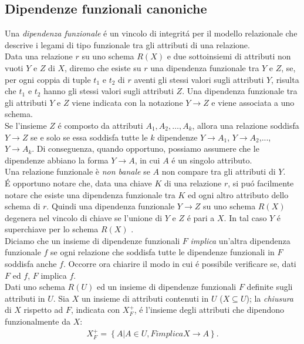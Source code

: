 \documentclass[11pt]{article}
\begin{document}
\subsection{Dipendenze funzionali canoniche}
Una \textit{dipendenza funzionale} \'e un vincolo di integrit\'a per il modello relazionale che descrive i legami di tipo funzionale tra gli attributi di una relazione. \\
Data una relazione $r$ su uno schema $R(X)$ e due sottoinsiemi di attributi non vuoti $Y$ e $Z$ di $X$, diremo che esiste su $r$ una dipendenza funzionale tra $Y$ e $Z$, se, per ogni coppia di tuple $t_1$ e $t_2$ di $r$ aventi gli stessi valori sugli attributi $Y$, risulta che $t_1$ e $t_2$ hanno gli stessi valori sugli attributi $Z$. Una dipendenza funzionale tra gli attributi $Y$ e $Z$ viene indicata con la notazione $Y \rightarrow Z$ e viene associata a uno schema. \\
Se l'insieme $Z$ \'e composto da attributi $A_1, A_2, \ldots, A_k$, allora una relazione soddisfa $Y \rightarrow Z$ se e solo se essa soddisfa tutte le $k$ dipendenze $Y \rightarrow A_1$, $Y \rightarrow A_2$,..., $Y \rightarrow A_k$. Di conseguenza, quando opportuno, possiamo assumere che le dipendenze abbiano la forma $Y \rightarrow A$, in cui $A$ \'e un singolo attributo. \\
Una relazione funzionale è \textit{non banale} se $A$ non compare tra gli attributi di $Y$. \\
\'E opportuno notare che, data una chiave $K$ di una relazione $r$, si pu\'o facilmente notare che esiste una dipendenza funzionale tra $K$ ed ogni altro attributo dello schema di $r$. Quindi una dipendenza funzionale $Y \rightarrow Z$ su uno schema $R(X)$ degenera nel vincolo di chiave se l'unione di $Y$ e $Z$ \'e pari a $X$. In tal caso $Y$ \'e superchiave per lo schema $R(X)$ . \\
Diciamo che un insieme di dipendenze funzionali $F$ \textit{implica} un'altra dipendenza funzionale $f$ se ogni relazione che soddisfa tutte le dipendenze funzionali in $F$ soddisfa anche $f$. Occorre ora chiarire il modo in cui \'e possibile verificare se, dati $F$ ed $f$, $F$ implica $f$. \\
Dati uno schema $R(U)$ ed un insieme di dipendenze funzionali $F$ definite sugli attributi in $U$. Sia $X$ un insieme di attributi contenuti in $U$ ($X \subseteq U$); la \textit{chiusura} di $X$ rispetto ad $F$, indicata con $X^{+}_F$, \'e l'insieme degli attributi che dipendono funzionalmente da $X$:
\begin{eqnarray}
X_F^{+} = \left\{A | A \in U, F implica X \rightarrow A \right\}.
\end{eqnarray}
\end{document}
